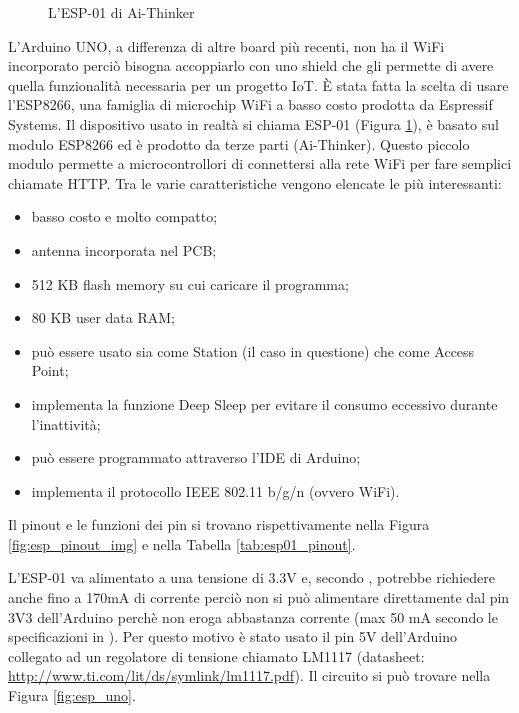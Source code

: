 \documentclass[12pt]{report}
\begin{document}
\begin{figure}[H]
	\caption{L'ESP-01 di Ai-Thinker}
	\label{fig:esp01}
\end{figure}

L'Arduino UNO, a differenza di altre board più recenti, non ha il WiFi incorporato perciò bisogna accoppiarlo con uno shield che gli permette di avere quella funzionalità necessaria per un progetto IoT. È stata fatta la scelta di usare l'ESP8266, una famiglia di microchip WiFi a basso costo prodotta da Espressif Systems. Il dispositivo usato in realtà si chiama ESP-01 (Figura \ref{fig:esp01}), è basato sul modulo ESP8266 ed è prodotto da terze parti (Ai-Thinker). Questo piccolo modulo permette a microcontrollori di connettersi alla rete WiFi per fare semplici chiamate HTTP.
Tra le varie caratteristiche vengono elencate le più interessanti:

\begin{itemize}
	\item basso costo e molto compatto;
	\item antenna incorporata nel PCB;
	\item 512 KB flash memory su cui caricare il programma;
	\item 80 KB user data RAM;
	\item può essere usato sia come Station (il caso in questione) che come Access Point;
	\item implementa la funzione Deep Sleep per evitare il consumo eccessivo durante l'inattività;
	\item può essere programmato attraverso l'IDE di Arduino;
	\item implementa il protocollo IEEE 802.11 b/g/n (ovvero WiFi).
\end{itemize}
Il pinout e le funzioni dei pin si trovano rispettivamente nella Figura \ref{fig:esp_pinout_img} e nella Tabella \ref{tab:esp01_pinout}. 

L'ESP-01 va alimentato a una tensione di 3.3V e, secondo \cite{esp_ds}, potrebbe richiedere anche fino a 170mA di corrente perciò non si può alimentare direttamente dal pin 3V3 dell'Arduino perchè non eroga abbastanza corrente (max 50 mA secondo le specificazioni in \cite{uno_specs}). Per questo motivo è stato usato il pin 5V dell'Arduino collegato ad un regolatore di tensione chiamato LM1117 (datasheet: \url{http://www.ti.com/lit/ds/symlink/lm1117.pdf}). 
Il circuito si può trovare nella Figura \ref{fig:esp_uno}.
\end{document}
